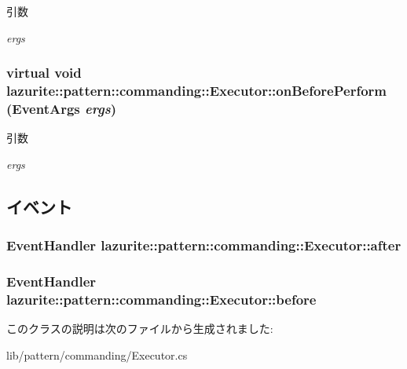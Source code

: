 \begin{DoxyParams}{引数}
\item[{\em ergs}]\end{DoxyParams}
\hypertarget{classlazurite_1_1pattern_1_1commanding_1_1_executor_a321dc544512f50dfb30cbfbad9927fca}{
\subsubsection[{onBeforePerform}]{\setlength{\rightskip}{0pt plus 5cm}virtual void lazurite::pattern::commanding::Executor::onBeforePerform (EventArgs {\em ergs})}}
\label{classlazurite_1_1pattern_1_1commanding_1_1_executor_a321dc544512f50dfb30cbfbad9927fca}

\begin{DoxyParams}{引数}
\item[{\em ergs}]\end{DoxyParams}


\subsection{イベント}
\hypertarget{classlazurite_1_1pattern_1_1commanding_1_1_executor_a193c80a09aa815985d1140da15798aa6}{
\subsubsection[{after}]{\setlength{\rightskip}{0pt plus 5cm}EventHandler lazurite::pattern::commanding::Executor::after}}
\label{classlazurite_1_1pattern_1_1commanding_1_1_executor_a193c80a09aa815985d1140da15798aa6}
\hypertarget{classlazurite_1_1pattern_1_1commanding_1_1_executor_aa8048561064752835707060029dd6e24}{
\subsubsection[{before}]{\setlength{\rightskip}{0pt plus 5cm}EventHandler lazurite::pattern::commanding::Executor::before}}
\label{classlazurite_1_1pattern_1_1commanding_1_1_executor_aa8048561064752835707060029dd6e24}


このクラスの説明は次のファイルから生成されました:\begin{DoxyCompactItemize}
\item 
lib/pattern/commanding/Executor.cs\end{DoxyCompactItemize}
